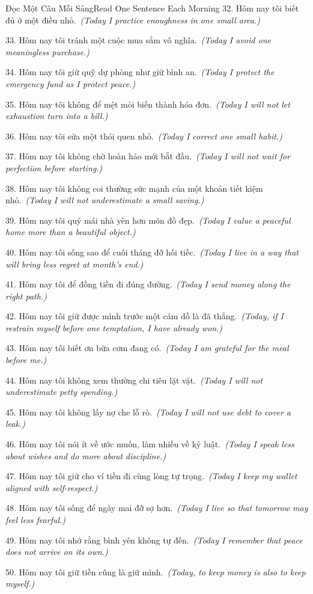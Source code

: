 \begin{truyen}{Đọc Một Câu Mỗi Sáng}{Read One Sentence Each Morning}
32. Hôm nay tôi biết đủ ở một điều nhỏ.\
\textit{(Today I practice enoughness in one small area.)}

33. Hôm nay tôi tránh một cuộc mua sắm vô nghĩa.\
\textit{(Today I avoid one meaningless purchase.)}

34. Hôm nay tôi giữ quỹ dự phòng như giữ bình an.\
\textit{(Today I protect the emergency fund as I protect peace.)}

35. Hôm nay tôi không để mệt mỏi biến thành hóa đơn.\
\textit{(Today I will not let exhaustion turn into a bill.)}

36. Hôm nay tôi sửa một thói quen nhỏ.\
\textit{(Today I correct one small habit.)}

37. Hôm nay tôi không chờ hoàn hảo mới bắt đầu.\
\textit{(Today I will not wait for perfection before starting.)}

38. Hôm nay tôi không coi thường sức mạnh của một khoản tiết kiệm nhỏ.\
\textit{(Today I will not underestimate a small saving.)}

39. Hôm nay tôi quý mái nhà yên hơn món đồ đẹp.\
\textit{(Today I value a peaceful home more than a beautiful object.)}

40. Hôm nay tôi sống sao để cuối tháng đỡ hối tiếc.\
\textit{(Today I live in a way that will bring less regret at month’s end.)}

41. Hôm nay tôi để đồng tiền đi đúng đường.\
\textit{(Today I send money along the right path.)}

42. Hôm nay tôi giữ được mình trước một cám dỗ là đã thắng.\
\textit{(Today, if I restrain myself before one temptation, I have already won.)}

43. Hôm nay tôi biết ơn bữa cơm đang có.\
\textit{(Today I am grateful for the meal before me.)}

44. Hôm nay tôi không xem thường chi tiêu lặt vặt.\
\textit{(Today I will not underestimate petty spending.)}

45. Hôm nay tôi không lấy nợ che lỗ rò.\
\textit{(Today I will not use debt to cover a leak.)}

46. Hôm nay tôi nói ít về ước muốn, làm nhiều về kỷ luật.\
\textit{(Today I speak less about wishes and do more about discipline.)}

47. Hôm nay tôi giữ cho ví tiền đi cùng lòng tự trọng.\
\textit{(Today I keep my wallet aligned with self-respect.)}

48. Hôm nay tôi sống để ngày mai đỡ sợ hơn.\
\textit{(Today I live so that tomorrow may feel less fearful.)}

49. Hôm nay tôi nhớ rằng bình yên không tự đến.\
\textit{(Today I remember that peace does not arrive on its own.)}

50. Hôm nay tôi giữ tiền cũng là giữ mình.\
\textit{(Today, to keep money is also to keep myself.)}
\end{truyen}

